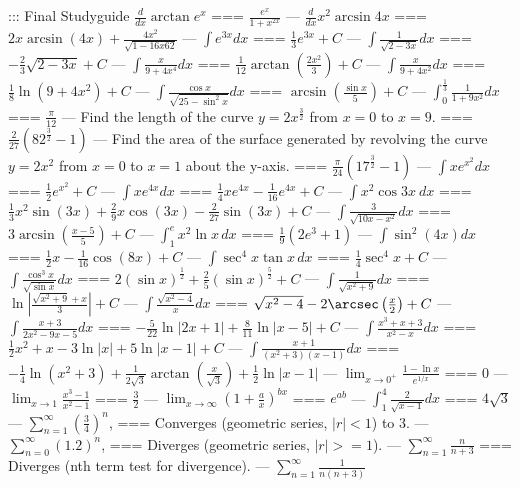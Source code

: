 ::: Final Studyguide
$\frac{d}{dx}\arctan e^x$
===
$\frac{e^x}{1+x^{2x}}$
---
$\frac{d}{dx}x^2\arcsin 4x$
===
$2x\arcsin(4x)+\frac{4x^2}{\sqrt{1-16x62}}$
---
$\int e^{3x}dx$
===
$\frac{1}{3}e^{3x}+C$
---
$\int\frac{1}{\sqrt{2-3x}}dx$
===
$-\frac{2}{3}\sqrt{2-3x}+C$
---
$\int\frac{x}{9+4x^4}dx$
===
$\frac{1}{12}\arctan\left(\frac{2x^2}{3}\right)+C$
---
$\int\frac{x}{9+4x^2}dx$
===
$\frac{1}{8}\ln(9+4x^2)+C$
---
$\int\frac{\cos x}{\sqrt{25-\sin^2 x}}dx$
===
$\arcsin\left(\frac{\sin x}{5}\right)+C$
---
$\int_0^{\frac{1}{3}}\frac{1}{1+9x^2}dx$
===
$\frac{\pi}{12}$
---
Find the length of the curve $y=2x^{\frac{3}{2}}$ from $x=0$ to $x=9$.
===
$\frac{2}{27}\left(82^{\frac{3}{2}}-1\right)$
---
Find the area of the surface generated by revolving the curve $y=2x^2$ from
$x=0$ to $x=1$ about the y-axis.
===
$\frac{\pi}{24}\left(17^{\frac{3}{2}}-1\right)$
---
$\int xe^{x^2} dx$
===
$\frac{1}{2}e^{x^2}+C$
---
$\int xe^{4x}dx$
===
$\frac{1}{4}xe^{4x}-\frac{1}{16}e^{4x}+C$
---
$\int x^2\cos 3x\ dx$
===
$\frac{1}{3}x^2\sin(3x)+\frac{2}{9}x\cos(3x)-\frac{2}{27}\sin(3x)+C$
---
$\int\frac{3}{\sqrt{10x-x^2}}dx$
===
$3\arcsin\left(\frac{x-5}{5}\right)+C$
---
$\int_1^e x^2\ln x\,dx$
===
$\frac{1}{9}(2e^3+1)$
---
$\int\sin^2(4x)dx$
===
$\frac{1}{2}x-\frac{1}{16}\cos(8x)+C$
---
$\int\sec^4 x\tan x\,dx$
===
$\frac{1}{4}\sec^4 x+C$
---
$\int\frac{\cos^3 x}{\sqrt{\sin x}}dx$
===
$2(\sin x)^{\frac{1}{2}}+\frac{2}{5}(\sin x)^{\frac{5}{2}}+C$
---
$\int\frac{1}{\sqrt{x^2+9}}dx$
===
$\ln\left|\frac{\sqrt{x^2+9}+x}{3}\right|+C$
---
$\int\frac{\sqrt{x^2-4}}{x}dx$
===
$\sqrt{x^2-4}-2\arcsec\left(\frac{x}{2}\right)+C$
---
$\int\frac{x+3}{2x^2-9x-5}dx$
===
$-\frac{5}{22}\ln|2x+1|+\frac{8}{11}\ln|x-5|+C$
---
$\int\frac{x^3+x+3}{x^2-x}dx$
===
$\frac{1}{2}x^2+x-3\ln|x|+5\ln|x-1|+C$
---
$\int\frac{x+1}{(x^2+3)(x-1)}dx$
===
$-\frac{1}{4}\ln(x^2+3)+\frac{1}{2\sqrt{3}}\arctan(\frac{x}{\sqrt{3}})+\frac{1}{2}\ln|x-1|$
---
$\lim_{x\to 0^+}\frac{1-\ln x}{e^{1/x}}$
===
0
---
$\lim_{x\to 1}\frac{x^3-1}{x^2-1}$
===
$\frac{3}{2}$
---
$\lim_{x\to\infty}\left(1+\frac{a}{x}\right)^{bx}$
===
$e^{ab}$
---
$\int_1^4\frac{2}{\sqrt{x-1}}dx$
===
$4\sqrt{3}$
---
$\sum_{n=1}^\infty\left(\frac{3}{4}\right)^n$,
===
Converges (geometric series, $|r|<1$) to 3.
---
$\sum_{n=0}^\infty(1.2)^n$,
===
Diverges (geometric series, $|r|>=1$).
---
$\sum_{n=1}^\infty\frac{n}{n+3}$
===
Diverges (nth term test for divergence).
---
$\sum_{n=1}^\infty\frac{1}{n(n+3)}$
